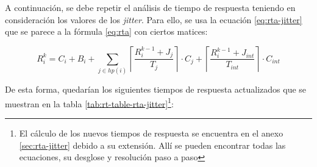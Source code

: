 A continuación, se debe repetir el análisis de tiempo de respuesta teniendo en
consideración los valores de los \textit{jitter}. Para ello, se usa la ecuación
\ref{eq:rta-jitter} que se parece a la fórmula \ref{eq:rta} con ciertos
matices:

\begin{equation}\label{eq:rta-jitter}
  R_i^k = C_i + B_i + \sum_{j \in hp\left(i\right)} \left\lceil\frac{R_i^{k - 1} + J_j}{T_j}\right\rceil\cdot C_j + \left\lceil\frac{R_i^{k - 1} + J_{int}}{T_{int}}\right\rceil\cdot C_{int}
\end{equation}

De esta forma, quedarían los siguientes tiempos de respuesta actualizados que se muestran
en la tabla \ref{tab:rt-table-rta-jitter}\footnote{El cálculo de los nuevos tiempos
de respuesta se encuentra en el anexo \ref{sec:rta-jitter} debido a su extensión. Allí
se pueden encontrar todas las ecuaciones, su desglose y resolución paso a paso}:

